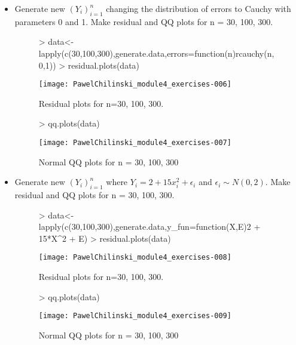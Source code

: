 \documentclass[a4paper]{article}
\begin{document}
\begin{itemize}
\item Generate new $(Y_i)_{i=1}^n$ changing the distribution of errors to Cauchy
with parameters 0 and 1. Make residual and QQ plots for n = 30, 100, 300.

\begin{figure}[H]
\begin{center}
\begin{Schunk}
\begin{Sinput}
> data<-lapply(c(30,100,300),generate.data,errors=function(n){rcauchy(n,0,1)})
> residual.plots(data)
\end{Sinput}
\end{Schunk}
\texttt{[image: PawelChilinski\_module4\_exercises-006]}
\caption{Residual plots for n=30, 100, 300.}
\end{center}
\end{figure}

\begin{figure}[H]
\begin{center}
\begin{Schunk}
\begin{Sinput}
> qq.plots(data)
\end{Sinput}
\end{Schunk}
\texttt{[image: PawelChilinski\_module4\_exercises-007]}
\caption{Normal QQ plots for n = 30, 100, 300}
\end{center}
\end{figure}

\item Generate new $(Y_i)_{i=1}^n$ where $Y_i=2+15x_i^2+\epsilon_i$ and
$\epsilon_i\sim N(0,2)$. Make residual and QQ plots for n = 30, 100, 300.

\begin{figure}[H]
\begin{center}
\begin{Schunk}
\begin{Sinput}
> data<-lapply(c(30,100,300),generate.data,y_fun=function(X,E){2 + 15*X^2 + E})
> residual.plots(data)
\end{Sinput}
\end{Schunk}
\texttt{[image: PawelChilinski\_module4\_exercises-008]}
\caption{Residual plots for n=30, 100, 300.}
\end{center}
\end{figure}

\begin{figure}[H]
\begin{center}
\begin{Schunk}
\begin{Sinput}
> qq.plots(data)
\end{Sinput}
\end{Schunk}
\texttt{[image: PawelChilinski\_module4\_exercises-009]}
\caption{Normal QQ plots for n = 30, 100, 300}
\end{center}
\end{figure}
\end{itemize}
\end{document}
